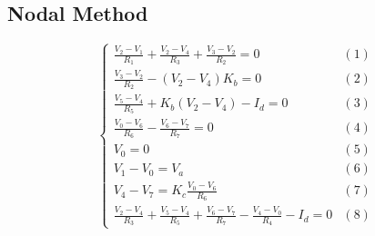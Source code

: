 


\subsection{Nodal Method}
\par



\begin{equation}
  \begin{cases}
    \frac{V_2-V_1}{R_1} + \frac{V_2-V_4}{R_3} + \frac{V_3-V_2}{R_2} = 0 & \mbox{$(1)$} \\
    \frac{V_3-V_2}{R_2} - (V_2-V_4) K_b = 0 & \mbox{$(2)$} \\
    \frac{V_5-V_4}{R_5} + K_b (V_2 - V_4) - I_d = 0 & \mbox{$(3)$}\\
    \frac{V_0-V_6}{R_6} - \frac{V_6-V_7}{R_7} = 0 & \mbox{$(4)$}\\
    V_0 = 0 & \mbox{$(5)$} \\
    V_1-V_0 = V_a & \mbox{$(6)$}  \\
    V_4-V_7 = K_c \frac{V_0-V_6}{R_6} & \mbox{$(7)$} \\
    \frac{V_2-V_4}{R_3} + \frac{V_5-V_4}{R_5} +  \frac{V_6-V_7}{R_7} - \frac{V_4-V_0}{R_4} - I_d = 0 & \mbox{$(8)$}
  \end{cases}
\end{equation}

